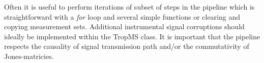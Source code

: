 Often it is useful to perform iterations of subset of steps in the pipeline which is straightforward with a \emph{for} loop and several simple functions or clearing and copying measurement sets. Additional instrumental signal corruptions should ideally be implemented within the TropMS class. It is important that the pipeline respects the causality of signal transmission path and/or the commutativity of Jones-matricies.

















